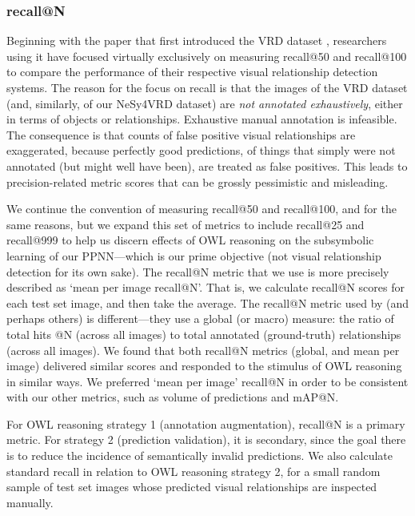 \documentclass[]{jair}
\begin{document}
\subsubsection{recall@N}
Beginning with the paper that first introduced the VRD dataset \cite{lu2016visual}, researchers using it have focused virtually exclusively on measuring recall@50 and recall@100 to compare the performance of their respective visual relationship detection systems.
The reason for the focus on recall is that the images of the VRD dataset (and, similarly, of our NeSy4VRD dataset) are \emph{not annotated exhaustively}, either in terms of objects or relationships.
Exhaustive manual annotation is infeasible.
The consequence is that counts of false positive visual relationships are exaggerated, because perfectly good predictions, of things that simply were not annotated (but might well have been), are treated as false positives.
This leads to precision-related metric scores that can be grossly pessimistic and misleading.

We continue the convention of measuring recall@50 and recall@100, and for the same reasons, but we expand this set of metrics to include recall@25 and recall@999 to help us discern effects of OWL reasoning on the subsymbolic learning of our PPNN---which is our prime objective (not visual relationship detection for its own sake).
The recall@N metric that we use is more precisely described as `mean per image recall@N'.
That is, we calculate recall@N scores for each test set image, and then take the average.
The recall@N metric used by \citet{lu2016visual} (and perhaps others) is different---they use a global (or macro) measure: the ratio of total hits @N (across all images) to total annotated (ground-truth) relationships (across all images).
We found that both recall@N metrics (global, and mean per image) delivered similar scores and responded to the stimulus of OWL reasoning in similar ways.
We preferred `mean per image' recall@N in order to be consistent with our other metrics, such as volume of predictions and mAP@N.

For OWL reasoning strategy 1 (annotation augmentation), recall@N is a primary metric.
For strategy 2 (prediction validation), it is secondary, since the goal there is to reduce the incidence of semantically invalid predictions.
We also calculate standard recall in relation to OWL reasoning strategy 2, for a small random sample of test set images whose predicted visual relationships are inspected manually.
\end{document}
